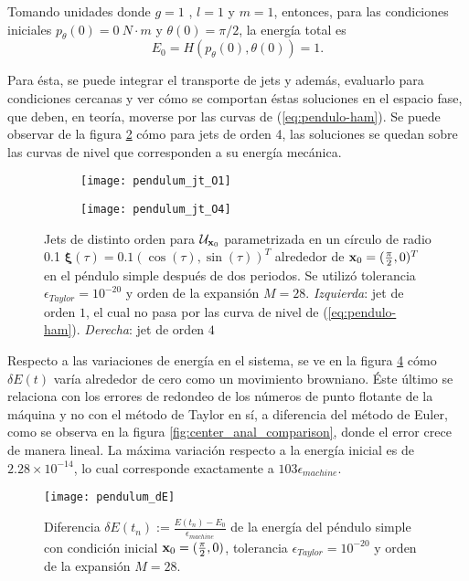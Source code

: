 Tomando unidades donde $g = 1 $ , $l=1$ y $m=1$,  entonces, para las condiciones iniciales $p_{\theta}(0) = 0 \ N \cdot m$ y $\theta(0) = \pi/2$, la energía total es 
\begin{equation*}
E_0 = H(p_{\theta}(0),\theta (0) ) = 1.
\end{equation*}

Para ésta, se puede integrar el transporte de jets y además, evaluarlo para condiciones cercanas y ver cómo se comportan éstas soluciones en el espacio fase, que deben, en teoría, moverse por las curvas de (\ref{eq:pendulo-ham}). Se puede observar de la figura \ref{fig:pendulum_jt_O4} cómo para jets de orden 4, las soluciones se quedan sobre las curvas de nivel que corresponden a su energía mecánica.

\begin{figure}[h!]
\centering
\begin{subfigure}{0.49\textwidth}
	\centering
	\texttt{[image: pendulum\_jt\_O1]}
	\label{fig:pendulum_jt_O1}
\end{subfigure}
%
\begin{subfigure}{0.49\textwidth}
	\centering
	\texttt{[image: pendulum\_jt\_O4]}
	\label{fig:pendulum_jt_O4}
\end{subfigure}
\caption{Jets de distinto orden para $\mathcal{U}_{\mathbf{x}_0}$ parametrizada en un círculo de radio 0.1 $\mathbf{\xi}(\tau) = 0.1\left( \cos(\tau),\sin(\tau) \right)^T$ alrededor de $\mathbf{x}_0 = (\frac{\pi}{2},0)^T$ en el péndulo simple después de dos periodos. Se utilizó tolerancia $\epsilon_{Taylor} = 10^{-20}$ y orden de la expansión $M = 28$. \textit{Izquierda}: jet de orden $1$, el cual no pasa por las curva de nivel de (\ref{eq:pendulo-ham}). \textit{Derecha}: jet de orden $4$}
\label{fig:pendulum_jt}
\end{figure}

Respecto a las variaciones de energía en el sistema, se ve en la figura \ref{fig:pendulum_dE} cómo $\delta E(t)$ varía alrededor de cero como un movimiento browniano. Éste último se relaciona con los errores de redondeo de los números de punto flotante de la máquina y no con el método de Taylor en sí, a diferencia del método de Euler, como se observa en la figura \ref{fig:center_anal_comparison}, donde el error crece de manera lineal. La máxima variación respecto a la energía inicial es de $2.28\times10^{-14}$, lo cual corresponde exactamente a $103 \epsilon_{machine}$.

\begin{figure}[h!]
 \centering
 \texttt{[image: pendulum\_dE]}
 \caption{Diferencia $\delta E(t_n) := \frac{E(t_n) - E_0}{\epsilon_{machine}}$ de la energía del péndulo simple con condición inicial $\mathbf{x}_0 = (\frac{\pi}{2},0)$, tolerancia $\epsilon_{Taylor} = 10^{-20}$ y orden de la expansión $M = 28$.}
 \label{fig:pendulum_dE}
\end{figure}

